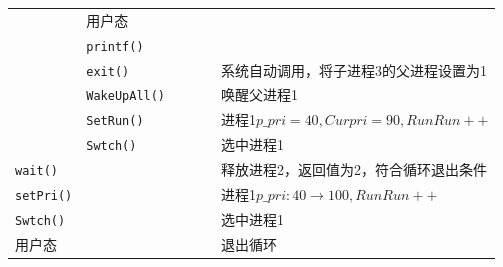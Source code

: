 \begin{landscape}
\begin{longtable}{llllll}
                 &                用户态 &        &           &             &\\
                 &                \texttt{printf()}   &                &           &             &\\
                 &                \texttt{exit()}   &                &           &             &系统自动调用，将子进程3的父进程设置为1\\
                 &                \texttt{WakeUpAll()}   &                &           &             &唤醒父进程1\\
                 &                \texttt{SetRun()}   &                &           &             &进程1$p\_pri=40,Curpri=90,RunRun++$\\
                 &                \texttt{Swtch()}   &                &           &             &选中进程1\\
                \texttt{wait()} &                  &                &           &             &释放进程2，返回值为2，符合循环退出条件\\
    \texttt{setPri()} &                  &                &           &             &进程1$p\_pri:40\rightarrow 100,RunRun++$\\
    \texttt{Swtch()} &                  &                &           &             &选中进程1\\
    用户态 &                  &                &           &             &退出循环\\\bottomrule
    \end{longtable}
\end{landscape}

